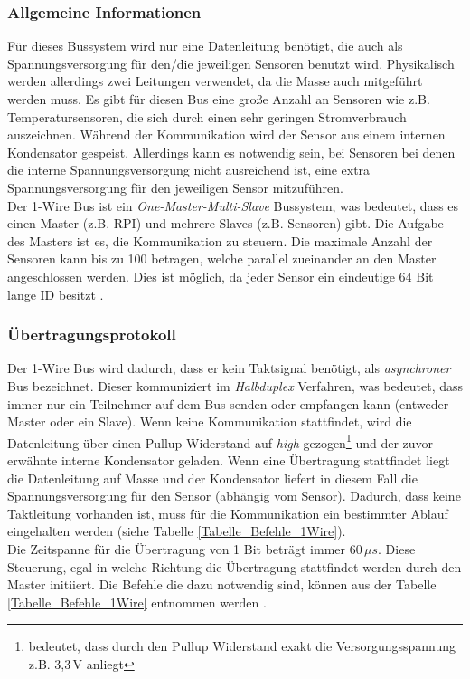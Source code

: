 \subsubsection*{Allgemeine Informationen}
\label{subsection_Allgemeine_Informationen_1Wire}
 Für dieses Bussystem wird nur eine Datenleitung benötigt, die auch als Spannungsversorgung für den\;/\;die jeweiligen Sensoren benutzt wird. Physikalisch werden allerdings zwei Leitungen verwendet, da die Masse auch mitgeführt werden muss. Es gibt für diesen Bus eine große Anzahl an Sensoren wie z.B. Temperatursensoren, die sich durch einen sehr geringen Stromverbrauch auszeichnen. Während der Kommunikation wird der Sensor aus einem internen Kondensator gespeist. Allerdings kann es notwendig sein, bei Sensoren bei denen die interne Spannungsversorgung nicht ausreichend ist, eine extra Spannungsversorgung für den jeweiligen Sensor mitzuführen. \\
Der 1-Wire Bus ist ein \textit{One-Master-Multi-Slave} Bussystem, was bedeutet, dass es  einen Master (z.B. \ac{RPI}) und mehrere Slaves (z.B. Sensoren) gibt. Die Aufgabe des Masters  ist es, die Kommunikation zu steuern. Die maximale Anzahl der Sensoren kann bis zu 100 betragen, welche parallel zueinander an den Master angeschlossen werden. Dies ist möglich, da jeder Sensor ein eindeutige 64 Bit lange ID besitzt \citep{Bussysteme_in_der_Praxis}.


\subsubsection*{Übertragungsprotokoll}
\label{subsection_Protokoll_1Wire}
Der 1-Wire Bus wird dadurch, dass er kein Taktsignal benötigt, als \textit{asynchroner} Bus bezeichnet. Dieser kommuniziert im \textit{Halbduplex} Verfahren, was bedeutet, dass immer nur ein Teilnehmer auf dem Bus senden oder empfangen kann (entweder Master oder ein Slave). Wenn keine Kommunikation stattfindet, wird die Datenleitung über einen Pullup-Widerstand auf \textit{high} gezogen\footnote{bedeutet, dass durch den Pullup Widerstand exakt die Versorgungsspannung z.B. 3,3\,V anliegt} und der zuvor erwähnte interne Kondensator geladen.  Wenn eine Übertragung stattfindet liegt die Datenleitung auf Masse und der Kondensator liefert in diesem Fall die Spannungsversorgung für den Sensor (abhängig vom Sensor). Dadurch, dass keine Taktleitung vorhanden ist, muss für die Kommunikation ein bestimmter Ablauf eingehalten werden (siehe Tabelle \ref{Tabelle_Befehle_1Wire}).\\
Die Zeitspanne für die Übertragung von 1 Bit beträgt immer 60\,$\mu s$. Diese Steuerung, egal in welche Richtung die Übertragung stattfindet werden durch den Master initiiert. Die Befehle die dazu notwendig sind, können aus der Tabelle \ref{Tabelle_Befehle_1Wire} entnommen werden \citep{Bussysteme_in_der_Praxis}.

